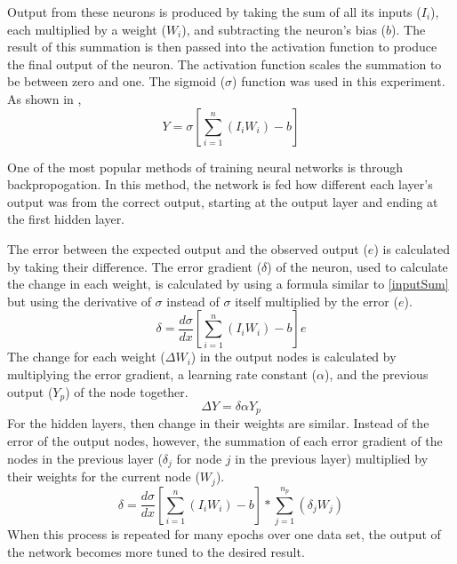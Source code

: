 \documentclass[12pt]{article}
\begin{document}
        Output from these neurons is produced by taking the sum of all its inputs (\(I_i\)), each multiplied by a weight (\(W_i\)), 
        and subtracting the neuron's bias (\(b\)).  The result of this summation is then passed into the activation function to produce 
        the final output of the neuron. The activation function scales the summation to be between zero and one.  
        The sigmoid (\(\sigma\)) function was used in this experiment. As shown in \cite{guideToIntSys},
        \begin{equation}\label{inputSum}
            Y = \sigma[\sum_{i=1}^{n} (I_i W_i) - b]
        \end{equation}

        One of the most popular methods of training neural networks is through backpropogation.  
        In this method, the network is fed how different each layer's output was from the correct output, 
        starting at the output layer and ending at the first hidden layer.

        The error between the expected output and the observed output (\(e\)) is calculated by taking their difference.
        The error gradient (\(\delta\)) of the neuron, used to calculate the change in each weight, is calculated by using a formula similar
        to \ref{inputSum} but using the derivative of \(\sigma\) instead of \(\sigma\) itself multiplied by the error (\(e\)).
        \begin{equation}\label{errGradient}
            \delta = \frac{d\sigma}{dx}[\sum_{i=1}^{n} (I_i W_i) - b] e
        \end{equation}
        The change for each weight (\(\Delta W_i\)) in the output nodes is calculated by multiplying the error gradient,
        a learning rate constant (\(\alpha\)), and the previous output (\(Y_p\)) of the node together.
        \begin{equation}\label{outputWeightDelta}
            \Delta Y = \delta \alpha Y_p
        \end{equation}
        For the hidden layers, then change in their weights are similar.  Instead of the error of the output nodes, however,
        the summation of each error gradient of the nodes in the previous layer (\(\delta_j\) for node \(j\) in the previous layer) 
        multiplied by their weights for the current node (\(W_j\)).
        \begin{equation}\label{hiddenWeightDelta}
            \delta = \frac{d\sigma}{dx}[\sum_{i=1}^{n} (I_i W_i) - b]*\sum_{j=1}^{n_p} (\delta_j W_j)
        \end{equation}
        When this process is repeated for many epochs over one data set, the output of the network becomes more
        tuned to the desired result.
\end{document}
